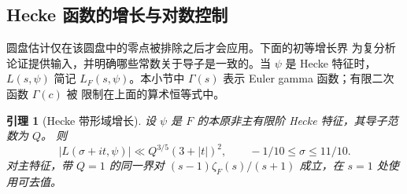 \documentclass[11pt,a4paper]{article}
\numberwithin{equation}{section}
\numberwithin{figure}{section}
\newtheorem{lemma}[theorem]{引理}
\theoremstyle{definition}
\theoremstyle{remark}
\begin{document}
\subsection{Hecke 函数的增长与对数控制}

圆盘估计仅在该圆盘中的零点被排除之后才会应用。下面的初等增长界
为复分析论证提供输入，并明确哪些常数关于导子是一致的。当 $\psi$
是 Hecke 特征时，$L(s,\psi)$ 简记 $L_F(s,\psi)$。本小节中
$\Gamma(s)$ 表示 Euler gamma 函数；有限二次函数 $\Gamma(c)$ 被
限制在上面的算术恒等式中。

\begin{lemma}[Hecke 带形域增长]\label{lem:hecke-strip-growth}
设 $\psi$ 是 $F$ 的本原非主有限阶 Hecke 特征，其导子范数为 $Q$。
则
\begin{equation}\label{eq:hecke-growth}
 |L(\sigma+it,\psi)|\ll Q^{3/5}(3+|t|)^2,
 \qquad-1/10\le\sigma\le11/10.
\end{equation}
对主特征，带 $Q=1$ 的同一界对 $(s-1)\zeta_F(s)/(s+1)$ 成立，在
$s=1$ 处使用可去值。
\end{lemma}
\end{document}
